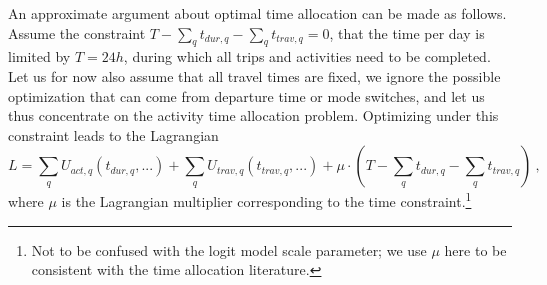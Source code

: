 An approximate argument about optimal time allocation can be made as follows.
Assume the constraint
$T - \sum_q t_{dur,q} - \sum_q t_{trav,q} = 0$, \ie that the time per day is limited by $T = 24h$, during which all trips and activities need to be completed.
%
%
%
Let us for now also assume that all travel times are fixed, \ie we ignore the possible optimization that can come from departure time or mode switches, and let us thus concentrate on the activity time allocation problem.
%
Optimizing under 
this constraint leads to the Lagrangian
\begin{equation}
L = \sum_q U_{act,q}(t_{dur,q}, ...) + \sum_q U_{trav,q}(t_{trav,q}, ...)
%
%
+ \mu \cdot (T - \sum_q t_{dur,q} - \sum_q t_{trav,q})  \ ,
\label{eq:lagrangian}
\end{equation}
where $\mu$ is the Lagrangian multiplier corresponding to the time constraint.\footnote{%
%
Not to be confused with the logit model scale parameter; we use $\mu$ here to be consistent with the time allocation literature. 
%
}

